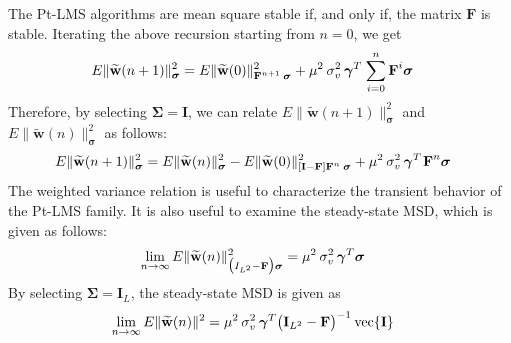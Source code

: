 \documentclass[journal, one column]{IEEEtran}
\begin{document}
The Pt-LMS algorithms are mean square stable if, and only if, the matrix $\textbf{F}$ is stable. Iterating the above recursion starting from $n=0$, we get
\begin{equation}\label{eq2.16}
\begin{split}
E\|\widetilde{\textbf{w}}(n+1)\|_{\boldsymbol{\sigma}}^{2}&= E\|\widetilde{\textbf{w}}(0)\|^{2}_{\textbf{F}^{n+1} \hspace{0.2em} \boldsymbol{\sigma}}
+ \mu^{2} \hspace{0.2em} \sigma^{2}_{v} \hspace{0.2em} \boldsymbol{\gamma}^{T} \hspace{0.1em} \sum\limits_{i=0}^{n} \textbf{F}^{i}\boldsymbol{\sigma}
\end{split}
\end{equation}
Therefore, by selecting $\boldsymbol{\Sigma}=\textbf{I}$, we can relate $E\|\widetilde{\textbf{w}}(n+1)\|_{\boldsymbol{\sigma}}^{2}$ and $E\|\widetilde{\textbf{w}}(n)\|_{\boldsymbol{\sigma}}^{2}$ as follows:
\begin{equation}\label{eq2.16}
\begin{split}
E\|\widetilde{\textbf{w}}(n+1)\|_{\boldsymbol{\sigma}}^{2}&= E\|\widetilde{\textbf{w}}(n)\|_{\boldsymbol{\sigma}}^{2}- E\|\widetilde{\textbf{w}}(0)\|^{2}_{[\textbf{I}-\textbf{F}]\textbf{F}^{n} \hspace{0.2em} \boldsymbol{\sigma}}
+ \mu^{2} \hspace{0.2em} \sigma^{2}_{v} \hspace{0.2em} \boldsymbol{\gamma}^{T} \hspace{0.1em}  \textbf{F}^{n}\boldsymbol{\sigma}
\end{split}
\end{equation}
The weighted variance relation is useful to characterize the transient behavior of the Pt-LMS family. It is also useful to examine the steady-state MSD, which is given as follows:
\begin{equation}\label{eq2.18}
\begin{split}
\lim\limits_{n \to \infty}E\|\widetilde{\textbf{w}}(n)\|_{\big(I_{L^{2}}- \textbf{F} \big) \boldsymbol{\sigma}}^{2}&= \mu^{2} \hspace{0.2em} \sigma^{2}_{v} \hspace{0.2em} \boldsymbol{\gamma}^{T} \boldsymbol{\sigma}
\end{split}
\end{equation}
By selecting $\boldsymbol{\Sigma}=\textbf{I}_{L}$, the steady-state MSD is given as
\begin{equation}\label{eq2.19}
\begin{split}
\lim\limits_{n \to \infty}E\|\widetilde{\textbf{w}}(n)\|^{2}&= \mu^{2} \hspace{0.2em} \sigma^{2}_{v} \hspace{0.2em} \boldsymbol{\gamma}^{T} \big(\textbf{I}_{L^{2}}- \textbf{F} \big)^{-1} \hspace{0.2em} \text{vec}\{ \textbf{I} \}
\end{split}
\end{equation}
\end{document}

